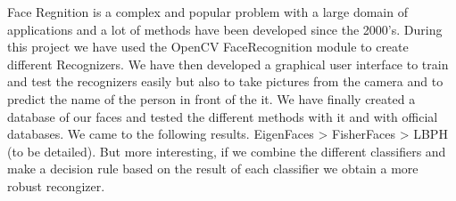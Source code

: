 Face Regnition is a complex and popular problem with a large domain of applications and a lot of methods have been developed since the 
2000's. During this project we have used the OpenCV FaceRecognition module to create different Recognizers. We have then developed a graphical user 
interface to train and test the recognizers easily but also to take pictures from the camera and to predict the name of the person in front of the 
it. We have finally created a database of our faces and tested the different methods with it and with official databases. We came to the 
following results. EigenFaces > FisherFaces > LBPH (to be detailed). But more interesting, if we combine the different classifiers and make a 
decision rule based on the result of each classifier we obtain a more robust recongizer.